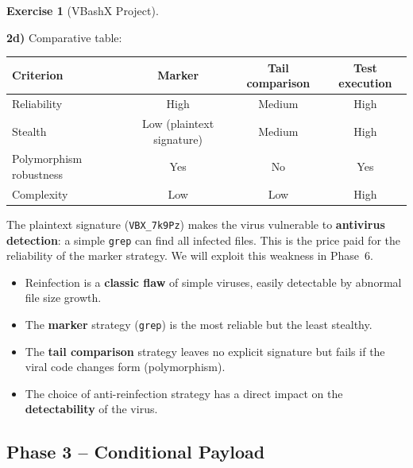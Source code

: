 \documentclass[a4paper,11pt]{article}
\theoremstyle{plain}
\theoremstyle{definition}
\newtheorem{exercice}{Exercise}
\begin{document}
\begin{exercice}[VBashX Project]
\begin{correction}
\textbf{2d)} Comparative table:
\begin{center}
\begin{tabular}{lccc}
\toprule
\textbf{Criterion} & \textbf{Marker} & \textbf{Tail comparison} & \textbf{Test execution} \\
\midrule
Reliability & High & Medium & High \\
Stealth & Low (plaintext signature) & Medium & High \\
Polymorphism robustness & Yes & No & Yes \\
Complexity & Low & Low & High \\
\bottomrule
\end{tabular}
\end{center}

\begin{attention}
The plaintext signature (\texttt{VBX\_7k9Pz}) makes the virus vulnerable to \textbf{antivirus detection}: a simple \texttt{grep} can find all infected files. This is the price paid for the reliability of the marker strategy. We will exploit this weakness in Phase~6.
\end{attention}

\begin{pointcle}
\begin{itemize}
    \item Reinfection is a \textbf{classic flaw} of simple viruses, easily detectable by abnormal file size growth.
    \item The \textbf{marker} strategy (\texttt{grep}) is the most reliable but the least stealthy.
    \item The \textbf{tail comparison} strategy leaves no explicit signature but fails if the viral code changes form (polymorphism).
    \item The choice of anti-reinfection strategy has a direct impact on the \textbf{detectability} of the virus.
\end{itemize}
\end{pointcle}

\end{correction}



\subsection*{Phase 3 -- Conditional Payload}


\end{exercice}
\end{document}
